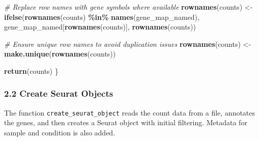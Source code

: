 \documentclass[
]{article}
\newenvironment{Shaded}{\begin{snugshade}}{\end{snugshade}}
\newcommand{\CommentTok}[1]{\textcolor[rgb]{0.56,0.35,0.01}{\textit{#1}}}
\newcommand{\FunctionTok}[1]{\textcolor[rgb]{0.13,0.29,0.53}{\textbf{#1}}}
\newcommand{\NormalTok}[1]{#1}
\newcommand{\OtherTok}[1]{\textcolor[rgb]{0.56,0.35,0.01}{#1}}
\newcommand{\SpecialCharTok}[1]{\textcolor[rgb]{0.81,0.36,0.00}{\textbf{#1}}}
\begin{document}
\begin{Shaded}
\begin{Highlighting}[]
  \CommentTok{\# Replace row names with gene symbols where available}
  \FunctionTok{rownames}\NormalTok{(counts) }\OtherTok{\textless{}{-}} \FunctionTok{ifelse}\NormalTok{(}\FunctionTok{rownames}\NormalTok{(counts) }\SpecialCharTok{\%in\%} \FunctionTok{names}\NormalTok{(gene\_map\_named),}
\NormalTok{                             gene\_map\_named[}\FunctionTok{rownames}\NormalTok{(counts)],}
                             \FunctionTok{rownames}\NormalTok{(counts))}
  
  \CommentTok{\# Ensure unique row names to avoid duplication issues}
  \FunctionTok{rownames}\NormalTok{(counts) }\OtherTok{\textless{}{-}} \FunctionTok{make.unique}\NormalTok{(}\FunctionTok{rownames}\NormalTok{(counts))}
  
  \FunctionTok{return}\NormalTok{(counts)}
\NormalTok{\}}
\end{Highlighting}
\end{Shaded}

\subsubsection{2.2 Create Seurat Objects}\label{create-seurat-objects}

The function \texttt{create\_seurat\_object} reads the count data from a
file, annotates the genes, and then creates a Seurat object with initial
filtering. Metadata for sample and condition is also added.
\end{document}
